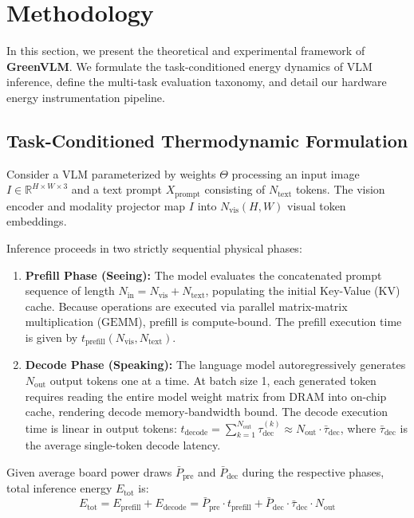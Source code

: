\section{Methodology}
\label{sec:methodology}

In this section, we present the theoretical and experimental framework of \textbf{GreenVLM}. We formulate the task-conditioned energy dynamics of VLM inference, define the multi-task evaluation taxonomy, and detail our hardware energy instrumentation pipeline.

\subsection{Task-Conditioned Thermodynamic Formulation}
Consider a VLM parameterized by weights $\Theta$ processing an input image $I \in \mathbb{R}^{H \times W \times 3}$ and a text prompt $X_{\text{prompt}}$ consisting of $N_{\text{text}}$ tokens. The vision encoder and modality projector map $I$ into $N_{\text{vis}}(H, W)$ visual token embeddings.

Inference proceeds in two strictly sequential physical phases:
\begin{enumerate}[leftmargin=*]
    \item \textbf{Prefill Phase (Seeing):} The model evaluates the concatenated prompt sequence of length $N_{\text{in}} = N_{\text{vis}} + N_{\text{text}}$, populating the initial Key-Value (KV) cache. Because operations are executed via parallel matrix-matrix multiplication ($\text{GEMM}$), prefill is compute-bound. The prefill execution time is given by $t_{\text{prefill}}(N_{\text{vis}}, N_{\text{text}})$.
    \item \textbf{Decode Phase (Speaking):} The language model autoregressively generates $N_{\text{out}}$ output tokens one at a time. At batch size 1, each generated token requires reading the entire model weight matrix from DRAM into on-chip cache, rendering decode memory-bandwidth bound. The decode execution time is linear in output tokens: $t_{\text{decode}} = \sum_{k=1}^{N_{\text{out}}} \tau_{\text{dec}}^{(k)} \approx N_{\text{out}} \cdot \bar{\tau}_{\text{dec}}$, where $\bar{\tau}_{\text{dec}}$ is the average single-token decode latency.
\end{enumerate}

Given average board power draws $\bar{P}_{\text{pre}}$ and $\bar{P}_{\text{dec}}$ during the respective phases, total inference energy $E_{\text{tot}}$ is:
\begin{equation}
    E_{\text{tot}} = E_{\text{prefill}} + E_{\text{decode}} = \bar{P}_{\text{pre}} \cdot t_{\text{prefill}} + \bar{P}_{\text{dec}} \cdot \bar{\tau}_{\text{dec}} \cdot N_{\text{out}}
    \label{eq:total_energy}
\end{equation}

